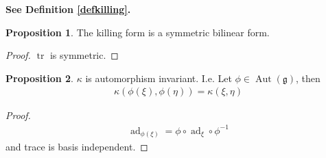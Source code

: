 \documentclass[10.5pt]{article}
\theoremstyle{definition}
\newtheorem{proposition}{Proposition}
\numberwithin{example}{subsection}
\numberwithin{proposition}{subsection}
\numberwithin{pb}{subsection}
\begin{document}
        \textbf{See Definition \ref{defkilling}.}

        \begin{proposition}\label{killingsymmetric}
            The killing form is a symmetric bilinear form.
        \end{proposition}
        \begin{proof}
            \(\operatorname{tr}\) is symmetric.
        \end{proof}

        \begin{proposition}\label{killingautinvariant}
            \(\kappa\) is automorphism invariant. I.e. Let \(\phi \in \operatorname{Aut}(\mathfrak{g})\), then
            \begin{align}
                \kappa(\phi(\xi),\phi(\eta)) = \kappa(\xi,\eta)
            \end{align}
        \end{proposition}
        \begin{proof}
            \begin{align}
                \operatorname{ad}_{\phi(\xi)} = \phi\circ \operatorname{ad}_\xi \circ \phi^{-1}
            \end{align}
            and trace is basis independent.
        \end{proof}
\end{document}
